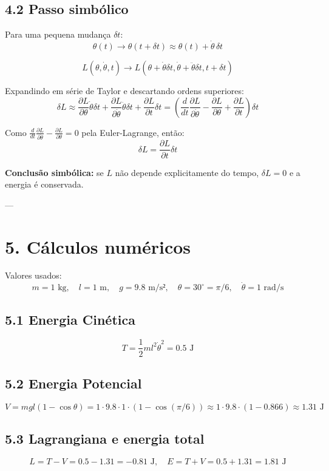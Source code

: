 \documentclass[12pt]{article}
\begin{document}
\subsection*{4.2 Passo simbólico}
Para uma pequena mudança $\delta t$:
\[
\theta(t) \to \theta(t+\delta t) \approx \theta(t) + \dot{\theta}\, \delta t
\]

\[
L(\theta, \dot{\theta}, t) \to L(\theta + \dot{\theta} \delta t, \dot{\theta} + \ddot{\theta} \delta t, t+\delta t)
\]

Expandindo em série de Taylor e descartando ordens superiores:
\[
\delta L \approx \frac{\partial L}{\partial \theta} \dot{\theta}\delta t + \frac{\partial L}{\partial \dot{\theta}} \ddot{\theta} \delta t + \frac{\partial L}{\partial t}\delta t
= \left(\frac{d}{dt} \frac{\partial L}{\partial \dot{\theta}} - \frac{\partial L}{\partial \theta} + \frac{\partial L}{\partial t}\right) \delta t
\]

Como $\frac{d}{dt} \frac{\partial L}{\partial \dot{\theta}} - \frac{\partial L}{\partial \theta} = 0$ pela Euler-Lagrange, então:
\[
\delta L = \frac{\partial L}{\partial t} \delta t
\]

\textbf{Conclusão simbólica:} se $L$ não depende explicitamente do tempo, $\delta L = 0$ e a energia é conservada.

---

\section*{5. Cálculos numéricos}

Valores usados:
\[
m = 1 \text{ kg},\quad l = 1 \text{ m},\quad g = 9.8 \text{ m/s²},\quad \theta = 30^\circ = \pi/6, \quad \dot{\theta} = 1 \text{ rad/s}
\]

\subsection*{5.1 Energia Cinética}
\[
T = \frac{1}{2} m l^2 \dot{\theta}^2 = 0.5 \text{ J}
\]

\subsection*{5.2 Energia Potencial}
\[
V = m g l (1 - \cos\theta) = 1 \cdot 9.8 \cdot 1 \cdot (1 - \cos(\pi/6)) 
\approx 1 \cdot 9.8 \cdot (1 - 0.866) \approx 1.31 \text{ J}
\]

\subsection*{5.3 Lagrangiana e energia total}
\[
L = T - V = 0.5 - 1.31 = -0.81 \text{ J}, \quad
E = T + V = 0.5 + 1.31 = 1.81 \text{ J}
\]
\end{document}
